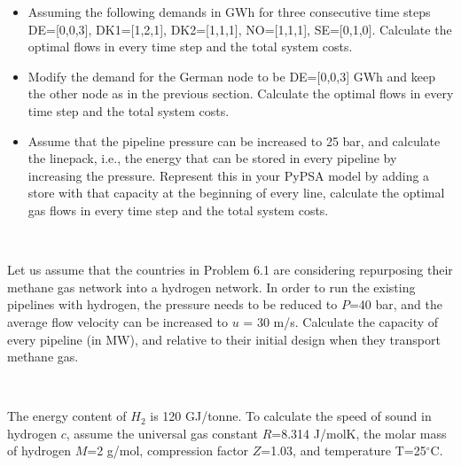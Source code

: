 \documentclass[10pt]{article}
\newenvironment{problem}[2][Problem]{\begin{trivlist}
\item[\hskip \labelsep {\bfseries #1}\hskip \labelsep {\bfseries #2.}]}{\end{trivlist}}
\begin{document}
\begin{problem}{6.1}
\begin{itemize}
\item[d)] Assuming the following demands in GWh for three consecutive time steps DE=[0,0,3], DK1=[1,2,1], DK2=[1,1,1], NO=[1,1,1], SE=[0,1,0]. Calculate the optimal flows in every time step and the total system costs. 

\item[e)] Modify the demand for the German node to be DE=[0,0,3] GWh and keep the other node as in the previous section. Calculate the optimal flows in every time step and the total system costs.

\item[f)] Assume that the pipeline pressure can be increased to 25 bar, and calculate the linepack, i.e., the energy that can be stored in every pipeline by increasing the pressure. Represent this in your PyPSA model by adding a store with that capacity at the beginning of every line, calculate the optimal gas flows in every time step and the total system costs.

\end{itemize}


\end{problem}

\

\begin{problem}{6.2}
Let us assume that the countries in Problem 6.1 are considering repurposing their methane gas network into a hydrogen network. In order to run the existing pipelines with hydrogen, the pressure needs to be reduced to $P$=40 bar, and the average flow velocity can be increased to $u$ = 30 m/s. Calculate the capacity of every pipeline (in MW), and relative to their initial design when they transport methane gas. 

\

The energy content of $H_2$ is 120 GJ/tonne. To calculate the speed of sound in hydrogen $c$, assume the universal gas constant $R$=8.314 J/molK, the molar mass of hydrogen $M$=2 g/mol, compression factor $Z$=1.03, and temperature T=25$^{\circ}$C.


\end{problem}

\
\end{document}
